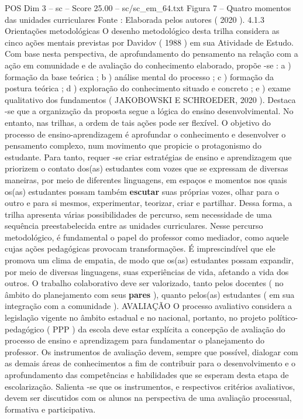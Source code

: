 \begin{textsample}{POS Dim 3 – sc – Score 25.00 – sc/sc\_em\_64.txt}
Figura 7 – Quatro momentos das unidades curriculares Fonte : Elaborada pelos autores ( 2020 ). 4.1.3 Orientações metodológicas O desenho metodológico desta trilha considera as cinco ações mentais previstas por Davidov ( 1988 ) em sua Atividade de Estudo.
Com base nesta perspectiva, de aprofundamento do pensamento na relação com a ação em comunidade e de avaliação do conhecimento elaborado, propõe -se : a ) formação da base teórica ; b ) análise mental do processo ; c ) formação da postura teórica ; d ) exploração do conhecimento situado e concreto ; e ) exame qualitativo dos fundamentos ( JAKOBOWSKI E SCHROEDER, 2020 ).
Destaca -se que a organização da proposta segue a lógica do ensino desenvolvimental.
No entanto, nas trilhas, a ordem de tais ações pode ser flexível.
O objetivo do processo de ensino-aprendizagem é aprofundar o conhecimento e desenvolver o pensamento complexo, num movimento que propicie o protagonismo do estudante.
Para tanto, requer -se criar estratégias de ensino e aprendizagem que priorizem o contato dos(as) estudantes com vozes que se expressam de diversas maneiras, por meio de diferentes linguagens, em espaços e momentos nos quais os(as) estudantes possam também \textbf{escutar} suas próprias vozes, olhar para o outro e para si mesmos, experimentar, teorizar, criar e partilhar.
Dessa forma, a trilha apresenta várias possibilidades de percurso, sem necessidade de uma sequência preestabelecida entre as unidades curriculares.
Nesse percurso metodológico, é fundamental o papel do professor como mediador, como aquele cujas ações pedagógicas provocam transformações.
É imprescindível que ele promova um clima de empatia, de modo que os(as) estudantes possam expandir, por meio de diversas linguagens, suas experiências de vida, afetando a vida dos outros.
O trabalho colaborativo deve ser valorizado, tanto pelos docentes ( no âmbito do planejamento com seus \textbf{pares} ), quanto pelos(as) estudantes ( em sua integração com a comunidade ).
AVALIAÇÃO O processo avaliativo considera a legislação vigente no âmbito estadual e no nacional, portanto, no projeto político-pedagógico ( PPP ) da escola deve estar explícita a concepção de avaliação do processo de ensino e aprendizagem para fundamentar o planejamento do professor.
Os instrumentos de avaliação devem, sempre que possível, dialogar com as demais áreas de conhecimentos a fim de contribuir para o desenvolvimento e o aprofundamento das competências e habilidades que se esperam desta etapa de escolarização.
Salienta -se que os instrumentos, e respectivos critérios avaliativos, devem ser discutidos com os alunos na perspectiva de uma avaliação processual, formativa e participativa.

\end{textsample}
